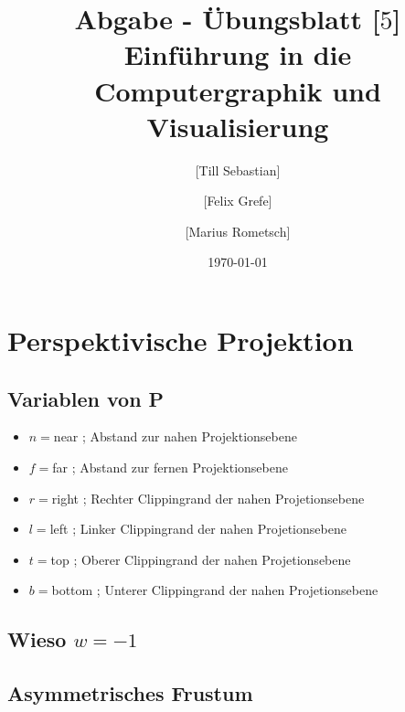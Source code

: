 \documentclass[10pt,a4paper]{article}
\begin{document}
\title{Abgabe - Übungsblatt [$5$]\\
\small{Einführung in die Computergraphik und Visualisierung}}
\author{ [Till Sebastian] \and [Felix Grefe] \and [Marius Rometsch]}
\date{\today}
\maketitle

\section{Perspektivische Projektion}
\subsection{Variablen von P}
\begin{itemize}
\item $n=$near ; Abstand zur nahen Projektionsebene
\item $f=$far ; Abstand zur fernen Projektionsebene
\item $r=$right ; Rechter Clippingrand der nahen Projetionsebene
\item $l=$left ; Linker Clippingrand der nahen Projetionsebene
\item $t=$top ; Oberer Clippingrand der nahen Projetionsebene
\item $b=$bottom ; Unterer Clippingrand der nahen Projetionsebene
\end{itemize}


\subsection{Wieso $w=-1$}

\subsection{Asymmetrisches Frustum}
\end{document}
